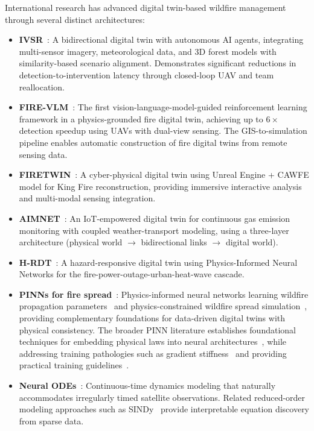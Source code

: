 \documentclass[11pt,twocolumn,a4paper]{article}
\newcommand{\abbrev}[1]{{\small\textsc{#1}}}
\begin{document}
International research has advanced digital twin-based wildfire management through several distinct architectures:

\begin{itemize}
  \item \textbf{\abbrev{IVSR}}~\cite{morsali2026}: A bidirectional digital twin with autonomous \abbrev{AI} agents, integrating multi-sensor imagery, meteorological data, and 3D forest models with similarity-based scenario alignment. Demonstrates significant reductions in detection-to-intervention latency through closed-loop \abbrev{UAV} and team reallocation.
  \item \textbf{\abbrev{FIRE-VLM}}~\cite{webb2026}: The first vision-language-model-guided reinforcement learning framework in a physics-grounded fire digital twin, achieving up to $6\times$ detection speedup using \abbrev{UAV}s with dual-view sensing. The \abbrev{GIS}-to-simulation pipeline enables automatic construction of fire digital twins from remote sensing data.
  \item \textbf{\abbrev{FIRETWIN}}~\cite{raha2025}: A cyber-physical digital twin using Unreal Engine + \abbrev{CAWFE} model for King Fire reconstruction, providing immersive interactive analysis and multi-modal sensing integration.
  \item \textbf{\abbrev{AIMNET}}~\cite{zhou2025}: An IoT-empowered digital twin for continuous gas emission monitoring with coupled weather-transport modeling, using a three-layer architecture (physical world $\to$ bidirectional links $\to$ digital world).
  \item \textbf{\abbrev{H-RDT}}~\cite{shen2025}: A hazard-responsive digital twin using Physics-Informed Neural Networks for the fire-power-outage-urban-heat-wave cascade.
  \item \textbf{\abbrev{PINN}s for fire spread}~\cite{vogiatzoglou2024,mao2024_pinn}: Physics-informed neural networks learning wildfire propagation parameters~\cite{vogiatzoglou2024} and physics-constrained wildfire spread simulation~\cite{mao2024_pinn}, providing complementary foundations for data-driven digital twins with physical consistency. The broader PINN literature establishes foundational techniques for embedding physical laws into neural architectures~\cite{karniadakis2021,cuomo2022,lu2021_deepxde,markidis2021}, while addressing training pathologies such as gradient stiffness~\cite{wang2021_gradient,krishnapriyan2021} and providing practical training guidelines~\cite{wang2023_expert}.\\
  \item \textbf{Neural ODEs}~\cite{chen2018}: Continuous-time dynamics modeling that naturally accommodates irregularly timed satellite observations. Related reduced-order modeling approaches such as SINDy~\cite{brunton2016_sindy} provide interpretable equation discovery from sparse data.\\

\end{itemize}
\end{document}
